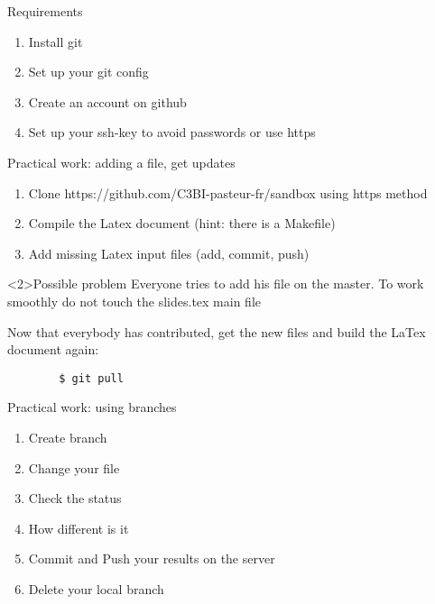 %




 
\begin{frame}[fragile]{Requirements}
    \begin{enumerate}
        \item Install git
        \item Set up your git config
        \item Create an account on github
        \item Set up your ssh-key to avoid passwords or use https
    \end{enumerate}
\end{frame}

\begin{frame}[fragile]{Practical work: adding a file, get updates}
    \begin{enumerate}
        \item Clone https://github.com/C3BI-pasteur-fr/sandbox using https method
        \item Compile the Latex document (hint: there is a Makefile)
        \item Add missing Latex input files (add, commit, push)
    \end{enumerate}
\pause
    \begin{alertblock}<2>{Possible problem}
        Everyone tries to add his file on the master. To work smoothly do not
touch the slides.tex main file 
    \end{alertblock}

\pause
Now that everybody has contributed, get the new files and build the LaTex
document again:
    \begin{lstlisting}
        $ git pull
    \end{lstlisting}
\end{frame}


\begin{frame}[fragile]{Practical work: using branches}
    \begin{enumerate}
        \item Create branch
        \item Change your file
        \item Check the status
        \item How different is it 
        \item Commit and Push your results on the server
        \item Delete your local branch
    \end{enumerate}

\end{frame}



